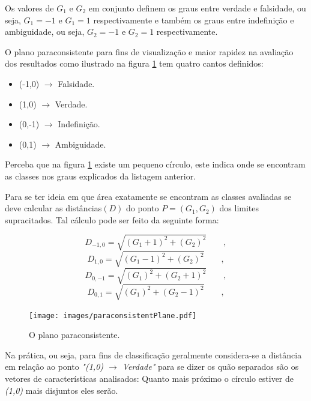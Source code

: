 \begin{myenv}{1.5}
				\par Os valores de $G_1$ e $G_2$ em conjunto definem os graus entre verdade e falsidade, ou seja, $G_1=-1$ e $G_1=1$ respectivamente e também os graus entre indefinição e ambiguidade, ou seja, $G_2=-1$ e $G_2=1$ respectivamente.
				\par O plano paraconsistente para fins de visualização e maior rapidez na avaliação dos resultados como ilustrado na figura \ref{fig:paraconsistentplane} tem quatro cantos definidos:
				\begin{itemize}
					\item (-1,0) $\rightarrow$ Falsidade.
					\item (1,0) $\rightarrow$ Verdade.
					\item (0,-1) $\rightarrow$ Indefinição.
					\item (0,1) $\rightarrow$ Ambiguidade.
				\end{itemize}
				\par Perceba que na figura \ref{fig:paraconsistentplane} existe um pequeno círculo, este indica onde se encontram as classes nos graus explicados da listagem anterior.
				\par Para se ter ideia em que área exatamente se encontram as classes avaliadas se deve calcular as distâncias$(D)$ do ponto $P=(G_1,G_2)$ dos limites supracitados. Tal cálculo pode ser feito da seguinte forma:

				\begin{equation}
					D_{-1,0}=\sqrt{(G_1+1)^2+(G_2)^2}\qquad,
				\end{equation}
				\begin{equation}
					D_{1,0}=\sqrt{(G_1-1)^2+(G_2)^2}\qquad,
				\end{equation}
				\begin{equation}
					D_{0,-1}=\sqrt{(G_1)^2+(G_2+1)^2}\qquad,		
				\end{equation}
				\begin{equation}
					D_{0,1}=\sqrt{(G_1)^2+(G_2-1)^2}\qquad,
				\end{equation}		

				\begin{figure}[h]
					\centering
					\texttt{[image: images/paraconsistentPlane.pdf]}
					\caption{O plano paraconsistente.}
					\label{fig:paraconsistentplane}
				\end{figure}
			
			\par Na prática, ou seja, para fins de classificação geralmente considera-se a distância em relação ao ponto \textit{"(1,0) $\rightarrow$ Verdade"} para se dizer os quão separados são os vetores de características analisados: Quanto mais próximo o círculo estiver de \textit{(1,0)} mais disjuntos eles serão.


\end{myenv}
